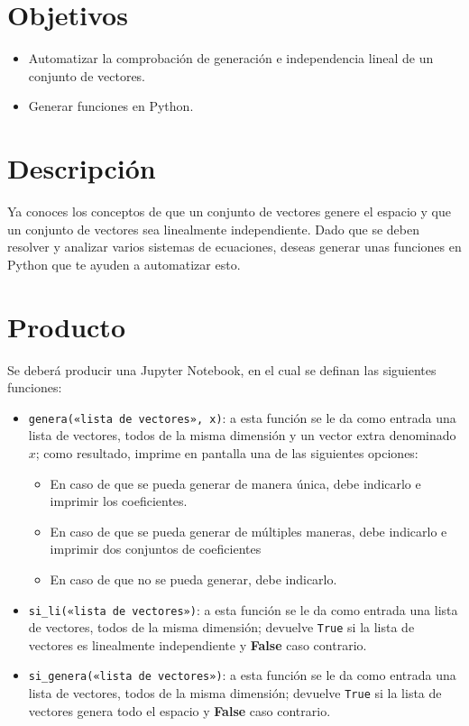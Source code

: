 \documentclass[a4,11pt]{aleph-notas}
\begin{document}
\encabezado

\section{Objetivos}

\begin{itemize}
\item 
    Automatizar la comprobación de generación e independencia lineal de un conjunto de vectores.
\item
    Generar funciones en Python.
\end{itemize}


\section{Descripción}

Ya conoces los conceptos de que un conjunto de vectores genere el espacio y que un conjunto de vectores sea linealmente independiente. Dado que se deben resolver y analizar varios sistemas de ecuaciones, deseas generar unas funciones en Python que te ayuden a automatizar esto. 

\section{Producto}

Se deberá producir una Jupyter Notebook, en el cual se definan las siguientes funciones:

\begin{itemize}
\item
    \texttt{genera(«lista de vectores», x)}: a esta función se le da como entrada una lista de vectores, todos de la misma dimensión y un vector extra denominado $x$; como resultado, imprime en pantalla una de las siguientes opciones:
    \begin{itemize}
    \item 
        En caso de que se pueda generar de manera única, debe indicarlo e imprimir los coeficientes.
    \item
        En caso de que se pueda generar de múltiples maneras, debe indicarlo e imprimir dos conjuntos de coeficientes
    \item
        En caso de que no se pueda generar, debe indicarlo.
    \end{itemize}
\item
    \texttt{si\_li(«lista de vectores»)}: a esta función se le da como entrada una lista de vectores, todos de la misma dimensión; devuelve \texttt{True} si la lista de vectores es linealmente independiente y \textbf{False} caso contrario.
\item
    \texttt{si\_genera(«lista de vectores»)}: a esta función se le da como entrada una lista de vectores, todos de la misma dimensión; devuelve \texttt{True} si la lista de vectores genera todo el espacio y \textbf{False} caso contrario.
\end{itemize}
\end{document}
